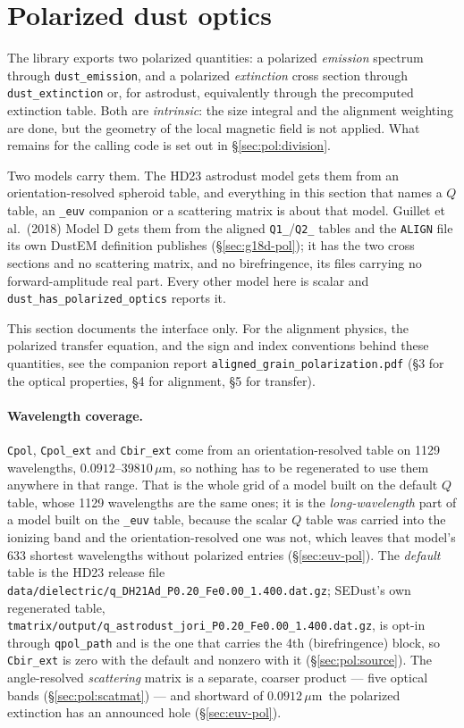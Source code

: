 \documentclass{my_memo}
\newcommand{\code}[1]{\texttt{#1}}
\newcommand{\um}{\ensuremath{\,\mu\mathrm{m}}}
\begin{document}
\section{Polarized dust optics}\label{sec:pol}

The library exports two polarized quantities: a polarized \emph{emission}
spectrum through \code{dust\_emission}, and a polarized \emph{extinction} cross
section through \code{dust\_extinction} or, for astrodust, equivalently through
the precomputed extinction table. Both are \emph{intrinsic}: the size integral
and the alignment weighting are done, but the geometry of the local magnetic
field is not applied. What remains for the calling code is set out in
\S\ref{sec:pol:division}.

Two models carry them. The HD23 astrodust model gets them from an
orientation-resolved spheroid table, and everything in this section that names a
$Q$ table, an \code{\_euv} companion or a scattering matrix is about that model.
Guillet et al.\ (2018) Model D gets them from the aligned \code{Q1\_}/\code{Q2\_}
tables and the \code{ALIGN} file its own DustEM definition publishes
(\S\ref{sec:g18d-pol}); it has the two cross sections and no scattering matrix,
and no birefringence, its files carrying no forward-amplitude real part. Every
other model here is scalar and \code{dust\_has\_polarized\_optics} reports it.

This section documents the interface only. For the alignment physics, the
polarized transfer equation, and the sign and index conventions behind these
quantities, see the companion report \code{aligned\_grain\_polarization.pdf}
(\S3 for the optical properties, \S4 for alignment, \S5 for transfer).

\paragraph{Wavelength coverage.} \code{Cpol}, \code{Cpol\_ext} and
\code{Cbir\_ext} come from an orientation-resolved table on 1129 wavelengths,
$0.0912$--$39810$\um, so nothing has to be regenerated to use them anywhere in
that range. That is the whole grid of a model built on the default $Q$ table,
whose 1129 wavelengths are the same ones; it is the \emph{long-wavelength} part
of a model built on the \code{\_euv} table, because the scalar $Q$ table was
carried into the ionizing band and the orientation-resolved one was not, which
leaves that model's 633 shortest wavelengths without polarized entries
(\S\ref{sec:euv-pol}). The
\emph{default} table is the
HD23 release file \code{data/dielectric/q\_DH21Ad\_P0.20\_Fe0.00\_1.400.dat.gz};
SEDust's own regenerated table,
\code{tmatrix/output/q\_astrodust\_jori\_P0.20\_Fe0.00\_1.400.dat.gz}, is opt-in
through \code{qpol\_path} and is the one that carries the 4th (birefringence)
block, so \code{Cbir\_ext} is zero with the default and nonzero with it
(\S\ref{sec:pol:source}). The angle-resolved \emph{scattering} matrix is a
separate, coarser product --- five optical bands (\S\ref{sec:pol:scatmat}) ---
and shortward of $0.0912$\um\ the polarized extinction has an announced hole
(\S\ref{sec:euv-pol}).
\end{document}
